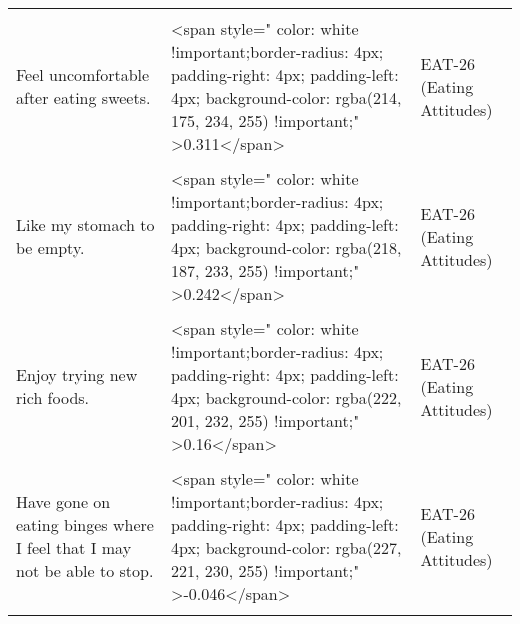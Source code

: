 \documentclass[border=1mm]{standalone}
\begin{document}
\begin{longtable}{lll}
\addlinespace
\cellcolor{gray!10}{Give too much time and thought to food.} & \cellcolor{gray!10}{<span style="     color: white !important;border-radius: 4px; padding-right: 4px; padding-left: 4px; background-color: rgba(220, 193, 233, 255) !important;" >0.211</span>} & \cellcolor{gray!10}{EAT-26 (Eating Attitudes)}\\
Feel uncomfortable after eating sweets. & <span style="     color: white !important;border-radius: 4px; padding-right: 4px; padding-left: 4px; background-color: rgba(214, 175, 234, 255) !important;" >0.311</span> & EAT-26 (Eating Attitudes)\\
\cellcolor{gray!10}{Engage in dieting behavior.} & \cellcolor{gray!10}{<span style="     color: white !important;border-radius: 4px; padding-right: 4px; padding-left: 4px; background-color: rgba(221, 198, 232, 255) !important;" >0.178</span>} & \cellcolor{gray!10}{EAT-26 (Eating Attitudes)}\\
Like my stomach to be empty. & <span style="     color: white !important;border-radius: 4px; padding-right: 4px; padding-left: 4px; background-color: rgba(218, 187, 233, 255) !important;" >0.242</span> & EAT-26 (Eating Attitudes)\\
\cellcolor{gray!10}{Have the impulse to vomit after meals.} & \cellcolor{gray!10}{<span style="     color: white !important;border-radius: 4px; padding-right: 4px; padding-left: 4px; background-color: rgba(215, 179, 234, 255) !important;" >0.29</span>} & \cellcolor{gray!10}{EAT-26 (Eating Attitudes)}\\
\addlinespace
Enjoy trying new rich foods. & <span style="     color: white !important;border-radius: 4px; padding-right: 4px; padding-left: 4px; background-color: rgba(222, 201, 232, 255) !important;" >0.16</span> & EAT-26 (Eating Attitudes)\\
\cellcolor{gray!10}{Find myself preoccupied with food.} & \cellcolor{gray!10}{<span style="     color: white !important;border-radius: 4px; padding-right: 4px; padding-left: 4px; background-color: rgba(220, 194, 233, 255) !important;" >0.201</span>} & \cellcolor{gray!10}{EAT-26 (Eating Attitudes)}\\
Have gone on eating binges where I feel that I may not be able to stop. & <span style="     color: white !important;border-radius: 4px; padding-right: 4px; padding-left: 4px; background-color: rgba(227, 221, 230, 255) !important;" >-0.046</span> & EAT-26 (Eating Attitudes)\\
\cellcolor{gray!10}{Cut my food into small pieces.} & \cellcolor{gray!10}{<span style="     color: white !important;border-radius: 4px; padding-right: 4px; padding-left: 4px; background-color: rgba(223, 206, 231, 255) !important;" >0.132</span>} & \cellcolor{gray!10}{EAT-26 (Eating Attitudes)}\\

\end{longtable}
\end{document}

